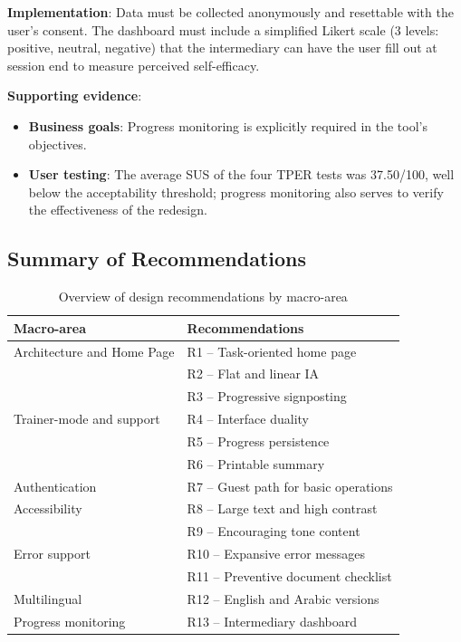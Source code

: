 ﻿\documentclass[11pt,a4paper]{article}
\begin{document}
\textbf{Implementation}: Data must be collected anonymously
and resettable with the user's consent. The dashboard must include a
simplified Likert scale (3 levels: positive, neutral, negative) that the intermediary can have
the user fill out at session end to measure perceived self-efficacy.

\textbf{Supporting evidence}:
\begin{itemize}
    \item \textbf{Business goals}: Progress monitoring is explicitly
    required in the tool's objectives.
    \item \textbf{User testing}: The average SUS of the four TPER tests
    was 37.50/100, well below the acceptability threshold;
    progress monitoring also serves to verify the effectiveness of the redesign.
\end{itemize}


\newpage
\subsection{Summary of Recommendations}

\begin{table}[htbp]
\centering
\caption{Overview of design recommendations by macro-area}
\label{tab:recommendations-summary}
\begin{tabular}{|p{2.8cm}|p{10cm}|}
\hline
\textbf{Macro-area} & \textbf{Recommendations} \\
\hline
Architecture and Home Page & R1 -- Task-oriented home page \\
& R2 -- Flat and linear IA \\
& R3 -- Progressive signposting \\
\hline
Trainer-mode and support & R4 -- Interface duality \\
& R5 -- Progress persistence \\
& R6 -- Printable summary \\
\hline
Authentication & R7 -- Guest path for basic operations \\
\hline
Accessibility & R8 -- Large text and high contrast \\
& R9 -- Encouraging tone content \\
\hline
Error support & R10 -- Expansive error messages \\
& R11 -- Preventive document checklist \\
\hline
Multilingual & R12 -- English and Arabic versions \\
\hline
Progress monitoring & R13 -- Intermediary dashboard \\
\hline
\end{tabular}
\end{table}
\end{document}
